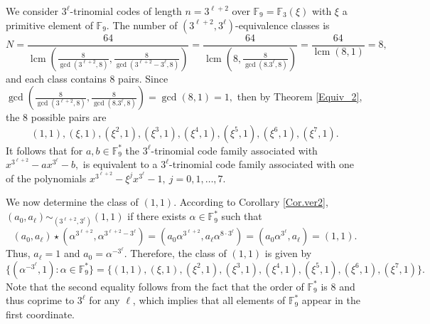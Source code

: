\documentclass[12pt]{elsarticle}
\DeclareMathOperator{\lcm}{lcm}
\theoremstyle{break}
{\theorembodyfont{\upshape}
    \newtheorem{theorem}{Theorem}[section] %
    \newtheorem{lemma}[theorem]{Lemma} %
    \newtheorem{proposition}[theorem]{Proposition}
    \newtheorem{corollary}[theorem]{Corollary}
    \newtheorem{definition}[theorem]{Definition}
    \newtheorem{example}[theorem]{Example}
    \newtheorem{remark}[theorem]{Remark}
    \newtheorem{conjecture}[theorem]{Conjecture}
    \newtheorem*{proof}{{Proof}}
	\newtheorem*{notation}{Notation}
	\newtheorem*{main}{Cain Theorem}
	\newtheorem*{problem}{Problem}
}
\begin{document}
 \begin{example}[$3^{\ell}$-trinomial codes of length $n=3^{\ell+2}$ over $\mathbb{F}_9$]
 We consider $3^{\ell}$-trinomial codes of length $n=3^{\ell+2}$ over $ \mathbb{F}_{9}= \mathbb{F}_{3}(\xi)$ with $\xi $ a primitive element of $\mathbb{F}_9$. The number of $(3^{\ell+2},3^{\ell})$-equivalence classes is 
 $$ N= \frac{64}{ \lcm( \frac{8}{\gcd( 3^{\ell+2},8)}, \frac{8}{\gcd( 3^{\ell+2}-3^{\ell},8)} )}  = \frac{64}{\lcm( 8, \frac{8}{\gcd(8. 3^{\ell},8)} )}= \frac{64}{\lcm( 8, 1 )} = 8,$$ 
 and each class contains $8$ pairs. Since $\gcd( \frac{8}{\gcd(3^{\ell+2},8)}, \frac{8}{\gcd(8. 3^{\ell},8)} )= \gcd( 8,1 )=1,$ then by Theorem \ref{Equiv_2}, the $8$ possible pairs are 
 $$ (1,1), (\xi,1), (\xi^2,1), (\xi^3,1), (\xi^4,1),(\xi^5,1), (\xi^6,1), (\xi^7,1). $$
It follows that for $a,b \in \mathbb{F}_9^*$ the  $3^{\ell}$-trinomial code family associated with $x^{3^{\ell+2}}-  a x^{3^{\ell}}- b,$ is equivalent to a $3^{\ell}$-trinomial code family associated with one of the polynomials   $x^{3^{\ell+2}}-  \xi^j x^{3^{\ell}}-1, \ j=0,1,\ldots, 7.$

We now determine the class of $(1,1)$. According to Corollary \ref{Cor.ver2}, $(a_0,a_{\ell})\sim_{(3^{\ell+2}, 3^{\ell})}(1,1)$ if there exists $\alpha \in \mathbb{F}_9^{*}$ such that  
$$
(a_0,a_{\ell})\star(\alpha^{3^{\ell+2}}, \alpha^{3^{\ell+2}-3^{\ell}}) = (a_0 \alpha^{3^{\ell+2}}, a_{\ell} \alpha^{8 \cdot 3^{\ell}}) = (a_0\alpha^{3^{\ell}}, a_{\ell})=
 (1,1).
$$
Thus, $a_{\ell}=1$ and $a_0= \alpha^{-3^{\ell}}$. Therefore, the class of $(1,1)$ is  given by 
$$
 \{ (\alpha^{-3^{\ell}} , 1) : \alpha\in \mathbb{F}_9^{*} \} =  \{ ( 1, 1), (\xi,1), (\xi^2,1), (\xi^3,1), (\xi^4,1), (\xi^5,1), (\xi^6,1), (\xi^7,1) \}.
$$
Note that the second equality follows from the fact that the order of $\mathbb{F}_9^*$ is $8$ and thus coprime to $3^\ell$ for any $\ell$, which implies that all elements of $\mathbb{F}_9^*$ appear in the first coordinate.


\end{example}
\end{document}
